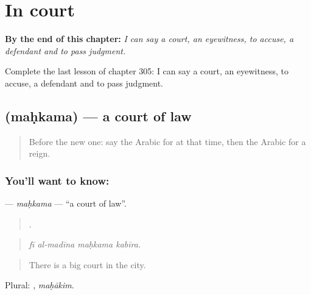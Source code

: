 
\chapter{In court}
\label{ch:ar-in-court}

\begin{chapteropening}
\textbf{By the end of this chapter:} \emph{I can say a court, an eyewitness, to accuse, a defendant and to pass judgment.}

Complete the last lesson of chapter 305: I can say a court, an eyewitness, to accuse, a defendant and to pass judgment.
\end{chapteropening}

\section[\texorpdfstring{\ar{محكمة} (maḥkama)}{محكمة (maḥkama)}]{ (maḥkama) — a court of law}

\label{lesson:AR-C305-mahkama}



\begin{quote}
Before the new one: say the Arabic for at that time, then the Arabic for a reign.
\end{quote}

\subsection*{You'll want to know: }
\textbf{} — \emph{maḥkama} — \textquotedblleft{}a court of law\textquotedblright{}.

\begin{quote}
   .
\end{quote}

\begin{quote}
\emph{fī al-madīna maḥkama kabīra.}
\end{quote}

\begin{quote}
There is a big court in the city.
\end{quote}

Plural: , \emph{maḥākim}.

